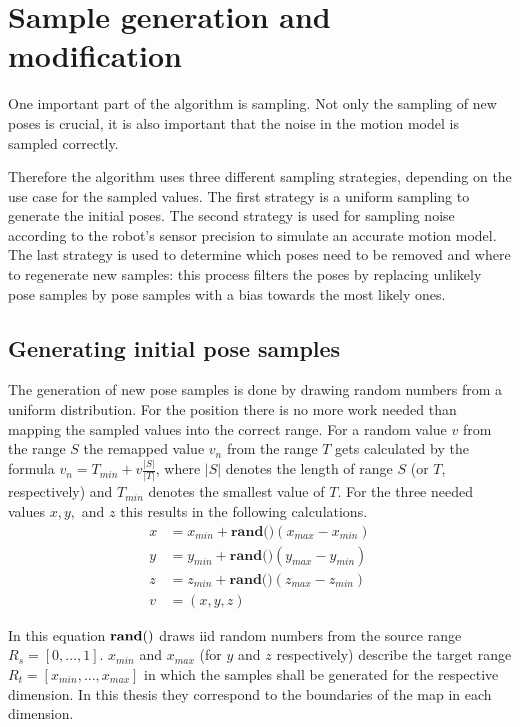 \documentclass[Thesis.tex]{subfiles}
\begin{document}
\section{Sample generation and modification}

One important part of the algorithm is sampling. Not only the sampling of new poses is crucial, it is also important that the noise in the motion model is sampled correctly. 

Therefore the algorithm uses three different sampling strategies, depending on the use case for the sampled values. The first strategy is a uniform sampling to generate the initial poses. The second strategy is used for sampling noise according to the robot's sensor precision to simulate an accurate motion model. The last strategy is used to determine which poses need to be removed and where to regenerate new samples: this process filters the poses by replacing unlikely pose samples by pose samples with a bias towards the most likely ones.

\subsection{Generating initial pose samples}\label{sec:init_samples}
The generation of new pose samples is done by drawing random numbers from a uniform distribution. For the position there is no more work needed than mapping the sampled values into the correct range. For a random value $v$ from the range $S$ the remapped value $v_n$ from the range $T$ gets calculated by the formula $v_n = T_{min} + v \frac{|S|}{|T|}$, where $|S|$ denotes the length of range $S$ (or $T$, respectively) and $T_{min}$ denotes the smallest value of $T$. For the three needed values $x, y,$ and $z$ this results in the following calculations.
%
\begin{align}
x &= x_{min} + \textbf{rand()} \left( x_{max} - x_{min} \right) \\
y &= y_{min} + \textbf{rand()} \left( y_{max} - y_{min} \right) \\
z &= z_{min} + \textbf{rand()} \left( z_{max} - z_{min} \right) \\
v &= (x, y, z)
\end{align}

In this equation ${\bf rand()}$ draws \gls{iid} random numbers from the source range $R_s = \left[0, \dots, 1\right]$. $x_{min}$ and $x_{max}$ (for $y$ and $z$ respectively) describe the target range $R_t = \left[x_{min}, \dots, x_{max}\right]$ in which the samples shall be generated for the respective dimension. In this thesis they correspond to the boundaries of the map in each dimension.
\end{document}
